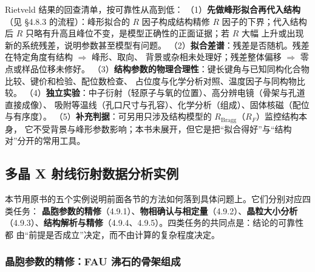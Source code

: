 \begin{crosscheck}
Rietveld 结果的回查清单，按可靠性从高到低：
（1）\textbf{先做峰形拟合再代入结构}（见 §4.8.3 的流程）：峰形拟合的 $R$ 因子构成结构精修
$R$ 因子的下界；代入结构后 $R$ 只略有升高且峰位不变，是模型正确性的正面证据；若 $R$ 大幅
上升或出现新的系统残差，说明参数甚至模型有问题。
（2）\textbf{拟合差谱}：残差是否随机。残差在特定角度有结构 $\Rightarrow$ 峰形、取向、
背景或杂相未处理好；残差整体偏移 $\Rightarrow$ 零点或样品位移未修好。
（3）\textbf{结构参数的物理合理性}：键长键角与已知同构化合物比较、键价和检验、配位数检查、
占位度与化学分析对照、温度因子与同构物比较。
（4）\textbf{独立实验}：中子衍射（轻原子与氧的位置）、高分辨电镜（骨架与孔道直接成像）、
吸附等温线（孔口尺寸与孔容）、化学分析（组成）、固体核磁（配位与有序度）。
（5）\textbf{补充判据}：可另用只涉及结构模型的 $R_{\mathrm{Bragg}}$（$R_{F}$）监控结构本身，
它不受背景与峰形参数影响；本书未展开，但它是把``拟合得好''与``结构对''分开的常用工具。
\end{crosscheck}

\subsection{多晶 X 射线衍射数据分析实例}

本节用原书的五个实例说明前面各节的方法如何落到具体问题上。它们分别对应四类任务：
\textbf{晶胞参数的精修}（4.9.1）、\textbf{物相确认与相定量}（4.9.2）、\textbf{晶粒大小分析}
（4.9.3）、\textbf{结构解析与精修}（4.9.4、4.9.5）。四类任务的共同点是：结论的可靠性都
由``前提是否成立''决定，而不由计算的复杂程度决定。

\subsubsection{晶胞参数的精修：FAU 沸石的骨架组成}

